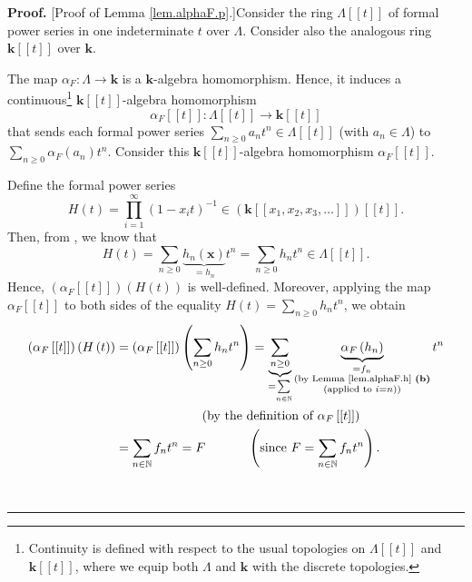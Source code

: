 \documentclass[numbers=enddot,12pt,final,onecolumn,notitlepage]{scrartcl}%
\theoremstyle{definition}
\newenvironment{proof}[1][Proof]{\noindent\textbf{#1.} }{\ \rule{0.5em}{0.5em}}
\let\sumnonlimits\sum
\let\prodnonlimits\prod
\renewcommand{\sum}{\sumnonlimits\limits}
\renewcommand{\prod}{\prodnonlimits\limits}
\newenvironment{verlong}{}{}
\begin{document}
\begin{verlong}
\begin{proof}
[Proof of Lemma \ref{lem.alphaF.p}.]Consider the ring $\Lambda\left[  \left[
t\right]  \right]  $ of formal power series in one indeterminate $t$ over
$\Lambda$. Consider also the analogous ring $\mathbf{k}\left[  \left[
t\right]  \right]  $ over $\mathbf{k}$.

The map $\alpha_{F}:\Lambda\rightarrow\mathbf{k}$ is a $\mathbf{k}$-algebra
homomorphism. Hence, it induces a continuous\footnote{Continuity is defined
with respect to the usual topologies on $\Lambda\left[  \left[  t\right]
\right]  $ and $\mathbf{k}\left[  \left[  t\right]  \right]  $, where we equip
both $\Lambda$ and $\mathbf{k}$ with the discrete topologies.} $\mathbf{k}%
\left[  \left[  t\right]  \right]  $-algebra homomorphism%
\[
\alpha_{F}\left[  \left[  t\right]  \right]  :\Lambda\left[  \left[  t\right]
\right]  \rightarrow\mathbf{k}\left[  \left[  t\right]  \right]
\]
that sends each formal power series $\sum_{n\geq0}a_{n}t^{n}\in\Lambda\left[
\left[  t\right]  \right]  $ (with $a_{n}\in\Lambda$) to $\sum_{n\geq0}%
\alpha_{F}\left(  a_{n}\right)  t^{n}$. Consider this $\mathbf{k}\left[
\left[  t\right]  \right]  $-algebra homomorphism $\alpha_{F}\left[  \left[
t\right]  \right]  $.

Define the formal power series
\[
H\left(  t\right)  =\prod_{i=1}^{\infty}\left(  1-x_{i}t\right)  ^{-1}%
\in\left(  \mathbf{k}\left[  \left[  x_{1},x_{2},x_{3},\ldots\right]  \right]
\right)  \left[  \left[  t\right]  \right]  .
\]
Then, from \cite[(2.4.1)]{GriRei}, we know that%
\[
H\left(  t\right)  =\sum_{n\geq0}\underbrace{h_{n}\left(  \mathbf{x}\right)
}_{=h_{n}}t^{n}=\sum_{n\geq0}h_{n}t^{n}\in\Lambda\left[  \left[  t\right]
\right]  .
\]
Hence, $\left(  \alpha_{F}\left[  \left[  t\right]  \right]  \right)  \left(
H\left(  t\right)  \right)  $ is well-defined. Moreover, applying the map
$\alpha_{F}\left[  \left[  t\right]  \right]  $ to both sides of the equality
$H\left(  t\right)  =\sum_{n\geq0}h_{n}t^{n}$, we obtain%
\begin{align*}
\left(  \alpha_{F}\left[  \left[  t\right]  \right]  \right)  \left(  H\left(
t\right)  \right)   &  =\left(  \alpha_{F}\left[  \left[  t\right]  \right]
\right)  \left(  \sum_{n\geq0}h_{n}t^{n}\right)  =\underbrace{\sum_{n\geq0}%
}_{=\sum_{n\in\mathbb{N}}}\underbrace{\alpha_{F}\left(  h_{n}\right)
}_{\substack{=f_{n}\\\text{(by Lemma \ref{lem.alphaF.h} \textbf{(b)}%
}\\\text{(applied to }i=n\text{))}}}t^{n}\\
&  \ \ \ \ \ \ \ \ \ \ \ \ \ \ \ \ \ \ \ \ \left(  \text{by the definition of
}\alpha_{F}\left[  \left[  t\right]  \right]  \right) \\
&  =\sum_{n\in\mathbb{N}}f_{n}t^{n}=F\ \ \ \ \ \ \ \ \ \ \left(  \text{since
}F=\sum_{n\in\mathbb{N}}f_{n}t^{n}\right)  .
\end{align*}



\end{proof}
\end{verlong}
\end{document}
